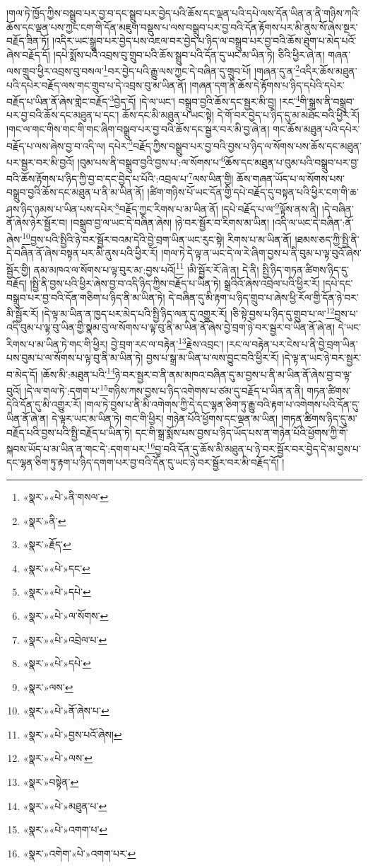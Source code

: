 །གལ་ཏེ་ཁྱོད་ཀྱིས་བསྒྲུབ་པར་བྱ་བ་དང་སྒྲུབ་པར་བྱེད་པའི་ཆོས་དང་ལྡན་པའི་དཔེ་ལས་དོན་ཡིན་ན་ནི་གཉིས་ཀའི་ཆོས་དང་ལྡན་པས་ཀྱང་ངག་གི་དོན་མཇུག་བསྡུས་པ་ལས་བསྒྲུབ་པར་བྱ་བའི་དོན་རྟོགས་པར་མི་ནུས་སོ་ཞེས་སྔར་བརྗོད་ཟིན་ཏོ། །འདིར་ཡང་སྒྲུབ་པར་བྱེད་པས་འཇལ་བར་བྱེད་པ་ཉིད་ལ་བསྒྲུབ་པར་བྱ་བའི་ཆོས་ཐུག་པ་མེད་པའོ་ཞེས་བརྗོད་དོ། །དཔེ་སྨོས་པའི་འབྲས་བུ་གྲུབ་པའི་ཆོས་སྒྲུབ་པའི་དོན་དུ་ཡང་མ་ཡིན་ཏེ། ཅིའི་ཕྱིར་ཞེ་ན། གཞན་ལས་གྲུབ་ཕྱིར་འབྲས་བུ་བསལ་\footnote{«སྣར་»«པེ་»ནི་གསལ་}བར་བྱེད་པའི་རྒྱུ་ལས་ཀྱང་དེ་བཞིན་དུ་གྲུབ་པོ། །གཞན་དུ་ན་\footnote{«སྣར་»ནི་}འདིར་ཆོས་མཐུན་པའི་དཔེར་བརྗོད་ལས་གང་གྲུབ་པ་དེ་འབྲས་བུ་མ་ཡིན་ནོ། །གཞན་དག་ནི་ཆོས་དེ་རྟོགས་པ་ཉིད་དཔེའི་དཔེར་བརྗོད་པ་ཡིན་ནོ་ཞེས་གླེང་བརྗོད་\footnote{«སྣར་»རྗོད་}བྱེད་དོ། །དེ་ལ་ཡང་། བསྒྲུབ་བྱའི་ཆོས་དང་སྦྱར་མི་བྱ། །རང་\footnote{«སྣར་»«པེ་»དང་}གི་སྒྲས་ནི་བསྒྲུབ་པར་བྱ་བའི་ཆོས་དང་མཐུན་པ་དང་། ཆོས་དང་མི་མཐུན་པ་ཡང་སྟེ། དེ་གོ་བར་བྱེད་པ་ཉིད་དུ་མ་མཐོང་བའི་ཕྱིར་རོ། །གང་ལ་གང་གིས་གང་གི་གང་ཞིག་བསྒྲུབ་པར་བྱ་བའི་ཆོས་དང་སྦྱར་བར་མི་བྱ་ཞེ་ན། གང་ཆོས་མཐུན་པའི་དཔེར་བརྗོད་པ་ལས་ཞེས་བྱ་བ་འདི་ལ། དཔེར་\footnote{«སྣར་»«པེ་»དཔེ་}བརྗོད་ཀྱིས་བསྒྲུབ་པར་བྱ་བའི་བྱས་པ་ཉིད་ལ་སོགས་པས་ཆོས་དང་མཐུན་པར་སྦྱར་བར་མི་བྱའོ། །བུམ་པས་ནི་བསྒྲུབ་བྱའི་བྱས་པ་:ལ་སོགས་པ་\footnote{«སྣར་»«པེ་»ལ་སོགས་}ཆོས་དང་མཐུན་པ་བུམ་པའི་བསྒྲུབ་པར་བྱ་བའི་ཆོས་རྟོགས་པ་ཉིད་ཀྱི་བྱ་བ་དང་བྱེད་པ་པོའི་:འབྲལ་པ་\footnote{«སྣར་»«པེ་»འབྲེལ་པ་}ལས་ཡིན་གྱི། ཆོས་གཞན་ཡོད་པ་ལ་སོགས་པས་བསྒྲུབ་བྱའི་ཆོས་དང་མཐུན་པ་ནི་མ་ཡིན་ནོ། །ཚིག་གཉིས་པོ་ཡང་དོན་གྱི་དཔེ་བརྗོད་དུ་བསྟན་པའི་ཕྱིར་ངག་གི་ཆ་ཤས་ཉིད་ཉམས་པ་ཡིན་པས་དཔེར་\footnote{«སྣར་»«པེ་»དཔེ་}བརྗོད་ཀྱང་རིགས་པ་མ་ཡིན་ནོ། །དཔེ་བརྗོད་པ་ལ་\footnote{«སྣར་»ལས་}ལྟོས་ནས་ནི། །དེ་བཞིན་ནོ་ཞེས་ཉེར་སྦྱོར་བ། །བསྒྲུབ་བྱ་ལ་ཡང་དེ་བཞིན་ཞེས། །ཉེ་བར་སྦྱོར་བ་རིགས་མ་ཡིན། །འདི་ལ་ཡང་དེ་བཞིན་:ནོ་ཞེས་\footnote{«སྣར་»«པེ་»ནོ་ཞེས་པ་}བྱས་པའི་སྤྱིའི་ཉེ་བར་སྦྱོར་བའམ་དེའི་བྱེ་བྲག་ཡིན་ཡང་རུང་སྟེ། རིགས་པ་མ་ཡིན་ནོ། །ཐམས་ཅད་ཀྱི་སྤྱི་ནི་དེ་བཞིན་ནོ་ཞེས་བསྟན་པར་མི་ནུས་པའི་ཕྱིར་རོ། །གལ་ཏེ་དེ་ལྟ་ན་ཡང་དེ་ལ་རེ་ཞིག་བྱས་པ་ནི་བུམ་པ་ལྟ་བུའོ་ཞེས་སྦྱོར་གྱི། ནམ་མཁའ་ལ་སོགས་པ་ལྟ་བུར་མ་:བྱས་པའོ།\footnote{«སྣར་»«པེ་»བྱས་པའོ་ཞེས།} །མི་སྦྱོར་རོ་ཞེ་ན། དེ་ནི། སྤྱི་ཉིད་གཏན་ཚིགས་ཉིད་དུ་བརྗོད། །སྤྱི་ནི་བྱས་པའི་ཕྱིར་ཞེས་བྱ་བ་འདི་ཉིད་ཀྱིས་བརྗོད་པ་ཡིན་ཏེ། སྒྲའིའོ་ཞེས་འབྲེལ་པའི་ཕྱིར་རོ། །དཔེ་དང་བསྒྲུབ་པར་བྱ་བའི་དོན་གཅིག་པ་ཉིད་ནི་མ་ཡིན་ཏེ། དེ་བཞིན་དུ་མི་རྟག་པ་ཉིད་གྲུབ་པ་ཞེས་ཕྱི་རོལ་གྱི་དོན་ཉེ་བར་མི་སྦྱོར་རོ། །དེ་ལྟ་མ་ཡིན་ན་ཁྱད་པར་མེད་པའི་སྤྱི་ཉིད་ལན་དུ་འགྱུར་རོ། །ཅི་སྟེ་བྱས་པ་ཉིད་དུ་གྲུབ་པ་ལ་\footnote{«སྣར་»«པེ་»ལས་}བྱས་པ་འདི་བུམ་པ་ལྟ་བུ་ཡིན་གྱི་སྣམ་བུ་ལ་སོགས་པ་ལྟ་བུ་ནི་མ་ཡིན་ནོ་ཞེས་བྱེ་བྲག་ཉེ་བར་སྦྱར་བ་ཡིན་ནོ་ཞེ་ན། དེ་ཡང་རིགས་པ་མ་ཡིན་ཏེ་གང་གི་ཕྱིར། བྱེ་བྲག་རང་ལ་བརྟེན་\footnote{«སྣར་»བསྟེན་}རྗེས་འབྲང་། །རང་ལ་བརྟེན་པར་ངེས་པ་ནི་བྱེ་བྲག་ཡིན་པས་བུམ་པ་ལ་སོགས་པ་ལྟ་བུ་ནི་མ་ཡིན་ཏེ། བྱས་པ་སྒྲ་མ་ཡིན་པ་ལས་བྱུང་བའི་ཕྱིར་རོ། །དེ་ལྟ་ན་ཡང་ཉེ་བར་སྦྱར་བ་མེད་དོ། །ཆོས་མི་:མཐུན་པའི་\footnote{«སྣར་»«པེ་»མཐུན་པ་}ཉེ་བར་སྦྱར་བ་ནི་ནམ་མཁའ་བཞིན་དུ་མ་བྱས་པ་ནི་མ་ཡིན་ནོ་ཞེས་བྱ་བ་ལྟ་བུའོ། །དེ་ལ་གལ་ཏེ་:དགག་པ་\footnote{«སྣར་»«པེ་»འགག་པ་}གཉིས་ཀས་བྱས་པ་ཉིད་འགེགས་པ་ཙམ་དུ་བརྗོད་པ་ཡིན་ན་ནི། གཏན་ཚིགས་དེའི་དོན་དུ་མི་འགྱུར་རོ། །གལ་ཏེ་བྱས་པ་ནི་མི་འགེགས་ཀྱི་དེ་དང་ལྷན་ཅིག་ཏུ་རྒྱུ་བའི་རྟག་པ་འགེགས་པའི་དོན་དུ་ཡིན་ནོ་ཞེ་ན། དེ་ལྟར་ཡང་མ་ཡིན་ཏེ། གང་གི་ཕྱིར། གཉེན་པོའི་ཕྱོགས་དང་ལྡན་མ་ཡིན། །གཏན་ཚིགས་ཉིད་དུ་མ་བརྗོད་པའི་བྱས་པའི་སྤྱི་བརྗོད་པ་ཡིན་ཏེ། དང་གི་སྒྲ་སྨོས་པས་བྱས་པ་ཉིད་ཡོད་པས་ན་གཉེན་པོའི་ཕྱོགས་ཀྱི་གོ་སྐབས་ཡོད་པ་མ་ཡིན་ན་གང་དེ་:དགག་པར་\footnote{«སྣར་»འགེག་«པེ་»འགག་པར་}བྱ་བའི་དོན་དུ་ཆོས་མི་མཐུན་པ་ཉེ་བར་སྦྱོར་བར་བྱེད་དེ་མ་བྱས་པ་དང་ལྷན་ཅིག་ཏུ་རྟག་པ་ཉིད་དགག་པར་བྱ་བའི་དོན་དུ་ཡང་ཉེ་བར་སྦྱོར་བར་མི་བརྗོད་དོ། །
